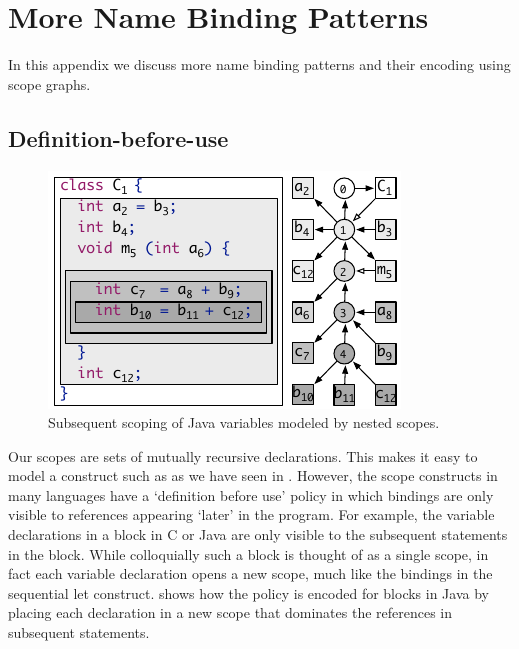 \section{More Name Binding Patterns}

In this appendix we discuss more name binding patterns and their encoding using
scope graphs.

\subsection{Definition-before-use}

\begin{figure}
\vspace*{-1\baselineskip}
\begin{boxedminipage}{\hsize}
\centering\includegraphics{figures/scope-graphs/subsequent/vars.pdf}
\end{boxedminipage}
\vspace*{-\baselineskip}
\caption{Subsequent scoping of Java variables modeled by nested scopes.}
\end{figure}

Our scopes are sets of mutually recursive declarations. This makes it easy to
model a construct such as  as we have seen in .
However, the scope constructs in many languages have a `definition before use'
policy in which bindings are only visible to references appearing `later' in the
program.
For example, the variable declarations in a
block in C or Java are only visible to the subsequent statements in the block.
While colloquially such a block is thought of as a single scope, in fact each
variable declaration opens a new scope, much like the bindings in the sequential
let construct.
 shows how the policy is encoded for blocks in Java by placing
each declaration in a new scope that dominates the references in subsequent
statements.

